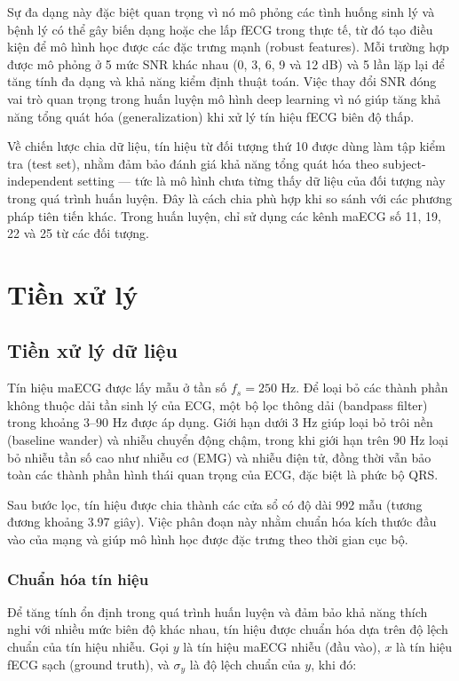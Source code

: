 Sự đa dạng này đặc biệt quan trọng vì nó mô phỏng các tình huống sinh lý và bệnh lý có thể gây biến dạng hoặc che lấp fECG trong thực tế, từ đó tạo điều kiện để mô hình học được các đặc trưng mạnh (robust features). Mỗi trường hợp được mô phỏng ở 5 mức SNR khác nhau (0, 3, 6, 9 và 12 dB) và 5 lần lặp lại để tăng tính đa dạng và khả năng kiểm định thuật toán. Việc thay đổi SNR đóng vai trò quan trọng trong huấn luyện mô hình deep learning vì nó giúp tăng khả năng tổng quát hóa (generalization) khi xử lý tín hiệu fECG biên độ thấp.

Về chiến lược chia dữ liệu, tín hiệu từ đối tượng thứ 10 được dùng làm tập kiểm tra (test set), nhằm đảm bảo đánh giá khả năng tổng quát hóa theo subject-independent setting — tức là mô hình chưa từng thấy dữ liệu của đối tượng này trong quá trình huấn luyện. Đây là cách chia phù hợp khi so sánh với các phương pháp tiên tiến khác. Trong huấn luyện, chỉ sử dụng các kênh maECG số 11, 19, 22 và 25 từ các đối tượng.

\section{Tiền xử lý}
\subsection{Tiền xử lý dữ liệu}

Tín hiệu maECG được lấy mẫu ở tần số $f_s = 250$ Hz. Để loại bỏ các thành phần không thuộc dải tần sinh lý của ECG, một bộ lọc thông dải (bandpass filter) trong khoảng $3$--$90$ Hz được áp dụng. Giới hạn dưới 3 Hz giúp loại bỏ trôi nền (baseline wander) và nhiễu chuyển động chậm, trong khi giới hạn trên 90 Hz loại bỏ nhiễu tần số cao như nhiễu cơ (EMG) và nhiễu điện tử, đồng thời vẫn bảo toàn các thành phần hình thái quan trọng của ECG, đặc biệt là phức bộ QRS.

Sau bước lọc, tín hiệu được chia thành các cửa sổ có độ dài 992 mẫu (tương đương khoảng 3.97 giây). Việc phân đoạn này nhằm chuẩn hóa kích thước đầu vào của mạng và giúp mô hình học được đặc trưng theo thời gian cục bộ.

\subsubsection{Chuẩn hóa tín hiệu}

Để tăng tính ổn định trong quá trình huấn luyện và đảm bảo khả năng thích nghi với nhiều mức biên độ khác nhau, tín hiệu được chuẩn hóa dựa trên độ lệch chuẩn của tín hiệu nhiễu. Gọi $y$ là tín hiệu maECG nhiễu (đầu vào), $x$ là tín hiệu fECG sạch (ground truth), và $\sigma_y$ là độ lệch chuẩn của $y$, khi đó:

